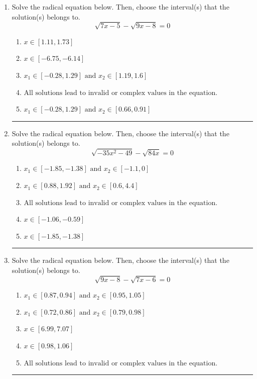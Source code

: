 \documentclass[14pt]{extbook}
\newcommand{\litem}[1]{\item#1\hspace*{-1cm}\rule{\textwidth}{0.4pt}}
\begin{document}
\begin{enumerate}
{\begin{enumerate}[label=\Alph*.]
\end{enumerate} }
\litem{
Solve the radical equation below. Then, choose the interval(s) that the solution(s) belongs to.\[ \sqrt{7 x - 5} - \sqrt{9 x - 8} = 0 \]\begin{enumerate}[label=\Alph*.]
\item \( x \in [1.11,1.73] \)
\item \( x \in [-6.75,-6.14] \)
\item \( x_1 \in [-0.28, 1.29] \text{ and } x_2 \in [1.19,1.6] \)
\item \( \text{All solutions lead to invalid or complex values in the equation.} \)
\item \( x_1 \in [-0.28, 1.29] \text{ and } x_2 \in [0.66,0.91] \)

\end{enumerate} }
\litem{
Solve the radical equation below. Then, choose the interval(s) that the solution(s) belongs to.\[ \sqrt{-35 x^2 - 49} - \sqrt{84 x} = 0 \]\begin{enumerate}[label=\Alph*.]
\item \( x_1 \in [-1.85, -1.38] \text{ and } x_2 \in [-1.1,0] \)
\item \( x_1 \in [0.88, 1.92] \text{ and } x_2 \in [0.6,4.4] \)
\item \( \text{All solutions lead to invalid or complex values in the equation.} \)
\item \( x \in [-1.06,-0.59] \)
\item \( x \in [-1.85,-1.38] \)

\end{enumerate} }
\litem{
Solve the radical equation below. Then, choose the interval(s) that the solution(s) belongs to.\[ \sqrt{9 x - 8} - \sqrt{7 x - 6} = 0 \]\begin{enumerate}[label=\Alph*.]
\item \( x_1 \in [0.87, 0.94] \text{ and } x_2 \in [0.95,1.05] \)
\item \( x_1 \in [0.72, 0.86] \text{ and } x_2 \in [0.79,0.98] \)
\item \( x \in [6.99,7.07] \)
\item \( x \in [0.98,1.06] \)
\item \( \text{All solutions lead to invalid or complex values in the equation.} \)


\end{enumerate}}
\end{enumerate}
\end{document}
